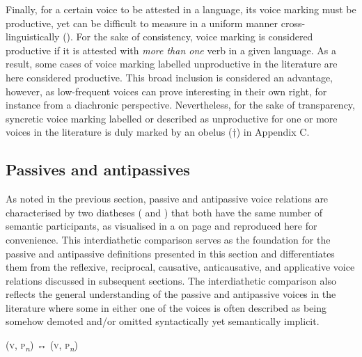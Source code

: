 Finally, for a certain voice to be attested in a language, its voice marking must be productive, yet  can be difficult to measure in a uniform manner cross-linguistically (). For the sake of consistency, voice marking is considered productive if it is attested with \textit{more than one} verb in a given language. As a result, some cases of voice marking labelled unproductive in the literature are here considered productive. This broad inclusion is considered an advantage, however, as low-frequent voices can prove interesting in their own right, for instance from a diachronic perspective. Nevertheless, for the sake of transparency, syncretic voice marking labelled or described as unproductive for one or more voices in the literature is duly marked by an obelus (†) in Appendix C.

\subsection{Passives and antipassives} \label{def:passives-antipassives}
As noted in the previous section, passive and antipassive voice relations are characterised by two diatheses ( and ) that both have the same number of semantic participants, as visualised in a on page \pageref{fig:ch2:diathetic-relations} and reproduced here for convenience. This interdiathetic comparison serves as the foundation for the passive and antipassive definitions presented in this section and differentiates them from the reflexive, reciprocal, causative, anticausative, and applicative voice relations discussed in subsequent sections. The interdiathetic comparison also reflects the general understanding of the passive and antipassive voices in the literature where some  in either one of the voices is often described as being somehow demoted and/or omitted syntactically yet semantically implicit.

\smallskip

\noindent
\begin{center}
	 (\textsc{v}, \textsc{p}\textsubscript{\textit{n}}) ↔  (\textsc{v}, \textsc{p}\textsubscript{\textit{n}})
\end{center}

